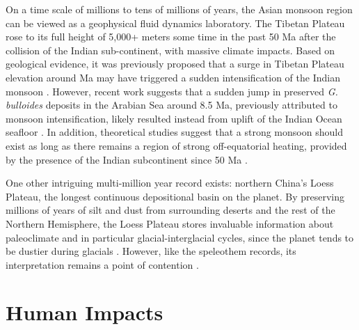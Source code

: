 	On a time scale of millions to tens of millions of years, the Asian monsoon region can be viewed as a geophysical fluid dynamics laboratory. The Tibetan Plateau rose to its full height of 5,000+ meters some time in the past 50 Ma after the collision of the Indian sub-continent, with massive climate impacts. Based on geological evidence, it was previously proposed that a surge in Tibetan Plateau elevation around  Ma may have triggered a sudden intensification of the Indian monsoon \citep{Harrison1992,Molnar1993}. However, recent work suggests that a sudden jump in preserved \textit{G. bulloides} deposits in the Arabian Sea around 8.5 Ma, previously attributed to monsoon intensification, likely resulted instead from uplift of the Indian Ocean seafloor \citep{Rodriguez2014}. In addition, theoretical studies suggest that a strong monsoon should exist as long as there remains a region of strong off-equatorial heating, provided by the presence of the Indian subcontinent since 50 Ma \citep{Prive2007a,Bordoni2008,Molnar2010}. 
	
	One other intriguing multi-million year record exists: northern China's Loess Plateau, the longest continuous depositional basin on the planet. By preserving millions of years of silt and dust from surrounding deserts and the rest of the Northern Hemisphere, the Loess Plateau stores invaluable information about paleoclimate and in particular glacial-interglacial cycles, since the planet tends to be dustier during glacials \citep{Sun2006}. However, like the speleothem records, its interpretation remains a point of contention \citep{Roe2009}.

\section{Human Impacts}

